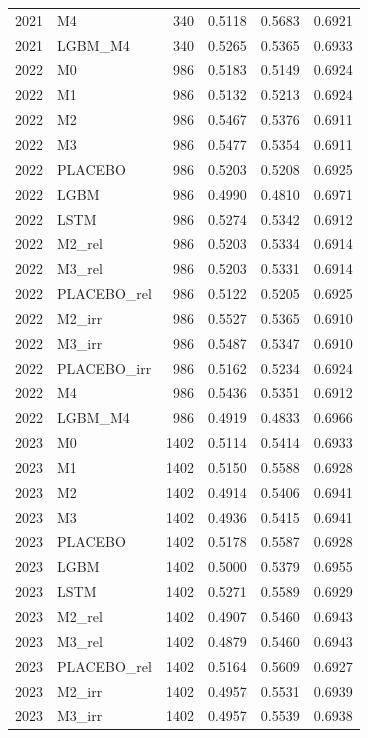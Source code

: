 \begin{tabular}{llrrrr}
2021 & M4 & 340 & 0.5118 & 0.5683 & 0.6921 \\
2021 & LGBM\_M4 & 340 & 0.5265 & 0.5365 & 0.6933 \\
2022 & M0 & 986 & 0.5183 & 0.5149 & 0.6924 \\
2022 & M1 & 986 & 0.5132 & 0.5213 & 0.6924 \\
2022 & M2 & 986 & 0.5467 & 0.5376 & 0.6911 \\
2022 & M3 & 986 & 0.5477 & 0.5354 & 0.6911 \\
2022 & PLACEBO & 986 & 0.5203 & 0.5208 & 0.6925 \\
2022 & LGBM & 986 & 0.4990 & 0.4810 & 0.6971 \\
2022 & LSTM & 986 & 0.5274 & 0.5342 & 0.6912 \\
2022 & M2\_rel & 986 & 0.5203 & 0.5334 & 0.6914 \\
2022 & M3\_rel & 986 & 0.5203 & 0.5331 & 0.6914 \\
2022 & PLACEBO\_rel & 986 & 0.5122 & 0.5205 & 0.6925 \\
2022 & M2\_irr & 986 & 0.5527 & 0.5365 & 0.6910 \\
2022 & M3\_irr & 986 & 0.5487 & 0.5347 & 0.6910 \\
2022 & PLACEBO\_irr & 986 & 0.5162 & 0.5234 & 0.6924 \\
2022 & M4 & 986 & 0.5436 & 0.5351 & 0.6912 \\
2022 & LGBM\_M4 & 986 & 0.4919 & 0.4833 & 0.6966 \\
2023 & M0 & 1402 & 0.5114 & 0.5414 & 0.6933 \\
2023 & M1 & 1402 & 0.5150 & 0.5588 & 0.6928 \\
2023 & M2 & 1402 & 0.4914 & 0.5406 & 0.6941 \\
2023 & M3 & 1402 & 0.4936 & 0.5415 & 0.6941 \\
2023 & PLACEBO & 1402 & 0.5178 & 0.5587 & 0.6928 \\
2023 & LGBM & 1402 & 0.5000 & 0.5379 & 0.6955 \\
2023 & LSTM & 1402 & 0.5271 & 0.5589 & 0.6929 \\
2023 & M2\_rel & 1402 & 0.4907 & 0.5460 & 0.6943 \\
2023 & M3\_rel & 1402 & 0.4879 & 0.5460 & 0.6943 \\
2023 & PLACEBO\_rel & 1402 & 0.5164 & 0.5609 & 0.6927 \\
2023 & M2\_irr & 1402 & 0.4957 & 0.5531 & 0.6939 \\
2023 & M3\_irr & 1402 & 0.4957 & 0.5539 & 0.6938 \\

\end{tabular}
